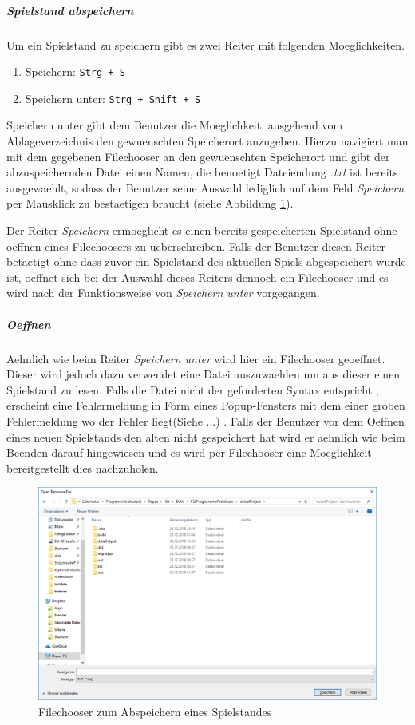 \subparagraph{Spielstand abspeichern}
Um ein Spielstand zu speichern gibt es zwei Reiter mit folgenden Moeglichkeiten.
\begin{enumerate}
	\item{Speichern: \verb|Strg + S|}
	\item{Speichern unter: \verb|Strg + Shift + S|}
\end{enumerate}
Speichern unter gibt dem Benutzer die Moeglichkeit, ausgehend vom Ablageverzeichnis den gewuenschten Speicherort anzugeben. Hierzu navigiert man mit dem gegebenen Filechooser an den gewuenschten Speicherort und gibt der abzuspeichernden Datei einen Namen, die benoetigt Dateiendung \emph{.txt} ist bereits ausgewaehlt, sodass der Benutzer seine Auswahl lediglich auf dem Feld \emph{Speichern} per Mausklick zu bestaetigen braucht (siehe Abbildung \ref{fig:filechooser}). 

Der Reiter \emph{Speichern} ermoeglicht es einen bereits gespeicherten Spielstand ohne oeffnen eines Filechoosers zu ueberschreiben. Falls der Benutzer diesen Reiter betaetigt ohne dass zuvor ein Spielstand des aktuellen Spiels abgespeichert wurde ist, oeffnet sich bei der Auswahl dieses Reiters dennoch ein Filechooser und es wird nach der Funktionsweise von \emph{Speichern unter} vorgegangen. 

\subparagraph{Oeffnen}
Aehnlich wie beim Reiter \emph{Speichern unter} wird hier ein Filechooser geoeffnet. Dieser wird jedoch dazu verwendet eine Datei auszuwaehlen um aus dieser einen Spielstand zu lesen. Falls die Datei nicht der geforderten Syntax entspricht , erscheint eine Fehlermeldung in Form eines Popup-Fensters mit dem einer groben Fehlermeldung wo der Fehler liegt(Siehe ...) 
. Falls der Benutzer vor dem Oeffnen eines neuen Spielstands den alten nicht gespeichert hat wird er aehnlich wie beim Beenden darauf hingewiesen und es wird per Filechooser eine Moeglichkeit bereitgestellt dies nachzuholen. 

\begin{figure}
	\centering
	\includegraphics{screenshots/screenshot_Filechooser}
	\caption[Filechooser]{Filechooser zum Abspeichern eines Spielstandes}
	\label{fig:filechooser}
\end{figure}

